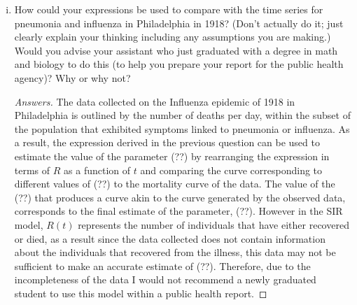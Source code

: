 \documentclass[12pt]{article}
\begin{document}
\begin{enumerate}[(a)]
\begin{enumerate}[(i)]
{\color{blue}
\begin{proof}[Solution]
{\color{magenta}

\begin{align}
		R_p &= 1- \frac{2}{\R_0} - (I_0+S_0) - \frac{1}{\R_0} \ln{\R_0 S_0}  \\
		t_p &= \frac{\sqrt{2}}{\sqrt{S_0\R_0^2(S_0-2)+2S_0\R_0 -1}} \Bigl ( \tan ^{-1} \left ( \frac{S_0\R_0^2 \left ( 1- \frac{2}{\R_0} - (I_0+S_0) - \frac{1}{\R_0} \ln{\R_0 S_0}  \right ) - S_0\R_0 +1}{\sqrt{S_0\R_0^2(S_0-2)+2S_0\R_0 -1}} \right )\\
		&-\tan ^{-1} \left ( \frac{1 - S_0\R_0 }{\sqrt{S_0\R_0^2(S_0-2)+2S_0\R_0 -1}} \right )  \Bigl ) 
	\end{align}

}
\end{proof}
}

\item How could your expressions be used to compare with the time series for pneumonia and influenza in Philadelphia in 1918?  (Don't actually do it; just clearly explain your thinking including any assumptions you are making.)  Would you advise your assistant who just graduated with a degree in math and biology to do this (to help you prepare your report for the public health agency)?  Why or why not?

{\color{blue}
\begin{proof}[Answers]
{\color{magenta} The data collected on the Influenza epidemic of 1918 in Philadelphia is outlined by the number of deaths per day, within the subset of the population that exhibited symptoms linked to pneumonia or influenza. As a result, the expression derived in the previous question can be used to estimate the value of the parameter (??) by rearranging the expression in terms of $R$ as a function of $t$ and comparing the curve corresponding to different values of (??) to the mortality curve of the data. The value of the (??) that produces a curve akin to the curve generated by the observed data, corresponds to the final estimate of the parameter, (??). However in the SIR model, $R(t)$ represents the number of individuals that have either recovered or died, as a result since the data collected does not contain information about the individuals that recovered from the illness, this data may not be sufficient to make an accurate estimate of (??). Therefore, due to the incompleteness of the data I would not recommend a newly graduated student to use this model within a public health report.}
\end{proof}
}
\begin{center}
\end{center}


\end{enumerate}
\end{enumerate}
\end{document}
